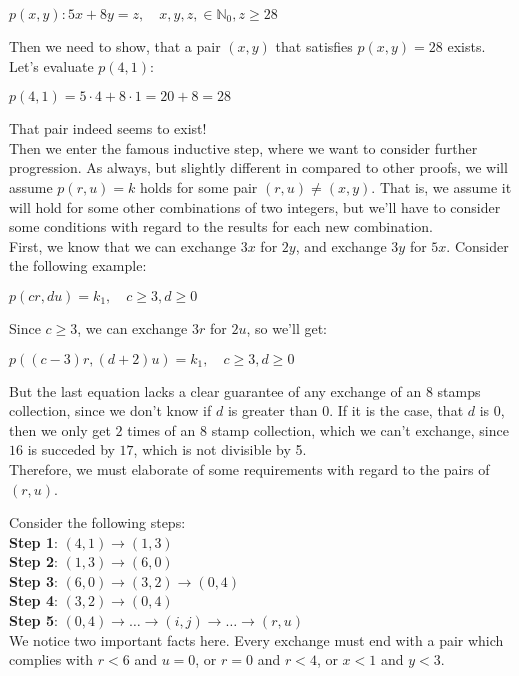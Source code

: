 \documentclass{report}
\newcommand{\cent}[1]{\begin{center}#1\end{center}}
\newcommand{\doubleN}{\mathbb{N}}
\newcommand{\In}{\! \in \!}
\newcommand{\defaultEnumerateLabel}{\textbf{\alph*.}}
\begin{document}
\begin{enumerate}[label=\defaultEnumerateLabel]
 		\cent{$p(x,y) : 5x+8y = z, \quad x,y,z ,\In \doubleN_0, z \geq 28$}
 		
 		Then we need to show, that a pair $(x,y)$ that satisfies $p(x,y) = 28$ exists. Let's evaluate $p(4,1)$:
 		
 		\cent{$p(4,1) = 5\cdot 4 + 8\cdot 1 = 20 +8 = 28$} 
 		
 		That pair indeed seems to exist!\\
 		
 		Then we enter the famous inductive step, where we want to consider further progression. As always, but slightly different in compared to other proofs, we will assume $p(r,u) = k$ holds for some pair $(r,u) \neq (x,y)$.  That is, we assume it will hold for some other combinations of two integers, but we'll have to consider some conditions with regard to the results for each new combination. \\
 		
 		First, we know that we can exchange $3x$ for $2y$, and exchange $3y$ for $5x$. Consider the following example:
 		
 		\cent{$p(cr,du) = k_1, \quad c \geq 3, d \geq 0$}
 		
 		Since $c\geq 3$, we can exchange $3r$ for $2u$, so we'll get:
 		
 		\cent{$p((c-3)r,(d+2)u) = k_1, \quad c \geq 3, d \geq 0$}
 		
 		But the last equation lacks a clear guarantee of any exchange of an 8 stamps collection, since we don't know if $d$ is greater than $0$. If it is the case, that $d$ is $0$, then we only get $2$ times of an 8 stamp collection, which we can't exchange, since $16$ is succeded by $ 17 $, which is not divisible by 5. \\
 		
 		Therefore, we must elaborate of some requirements with regard to the pairs of $(r,u)$. 
 		
 		Consider the following steps:\\
 		
		\textbf{Step 1}: $(4,1) \to (1,3)$\\
		\textbf{Step 2}: $(1,3) \to (6,0)$\\
		\textbf{Step 3}: $(6,0) \to (3,2) \to (0,4)$\\
		\textbf{Step 4}: $(3,2) \to (0,4)$ \\
		\textbf{Step 5}: $(0,4) \to \dots  \to (i,j) \to \dots \to (r,u)$\\
 			
 		We notice two important facts here. Every exchange must end with a pair which complies with $r < 6$ and $u = 0$, or $r = 0$ and $r < 4$, or $x < 1$ and $y < 3$. 
 		

\end{enumerate}
\end{document}
